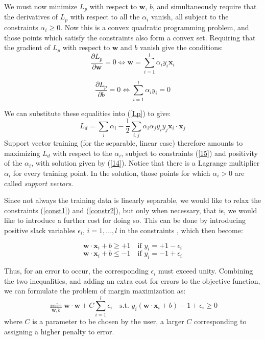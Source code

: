 We must now minimize $L_p$ with respect to $\mathbf{w}$, $b$, and simultaneously require that the
derivatives of $L_p$ with respect to all the $\alpha_i$ vanish, all subject to the constraints $\alpha_i \ge 0$. Now this is a convex quadratic programming
problem, and those points which satisfy the
constraints also form a convex set. Requiring that the gradient of $L_p$ with respect to $\mathbf{w}$ and $b$ vanish give the conditions:
\begin{equation}
\frac{\partial L_p}{\partial \mathbf{w}} = 0 \Longleftrightarrow \mathbf{w} = \sum_{i=1}^l \alpha_i y_i \mathbf{x}_i
\label{14}
\end{equation}

\begin{equation}
\frac{\partial L_p}{\partial b} = 0 \Longleftrightarrow \sum_{i=1}^l \alpha_i y_i =0
\label{15}
\end{equation}

We can substitute these equalities into (\ref{Lp}) to give:
\begin{equation}
L_d=  \sum_{i} \alpha_i - \frac{1}{2} \sum_{i,j} \alpha_i\alpha_j y_iy_j \mathbf{x}_i \cdot \mathbf{x}_j
\end{equation}
Support vector training (for the separable, linear case) therefore amounts to maximizing
$L_d$ with respect to the $\alpha_i$, subject to constraints (\ref{15}) and positivity of the $\alpha_i$, with solution
given by (\ref{14}). Notice that there is a Lagrange multiplier $\alpha_i$ for every training point. In
the solution, those points for which $\alpha_i > 0$ are called \textit{support vectors}.

Since not always the training data is linearly separable, we would like to relax the constraints (\ref{const1}) and (\ref{constr2}), but only when necessary, that is, we would like to introduce a further cost for
doing so. This can be done by introducing positive slack variables $\epsilon_i$, $i = 1, ... , l$ in the
constraints \cite{cortes1995support}, which then become:

\begin{equation}
\mathbf{w} \cdot \mathbf{x}_i + b \ge +1 \quad \text{if } y_i = +1 - \epsilon_i
\label{const1b}
\end{equation}
\begin{equation}
\mathbf{w} \cdot \mathbf{x}_i + b \le -1 \quad \text{if } y_i = -1 + \epsilon_i
\label{constr2b}
\end{equation}

Thus, for an error to occur, the corresponding $\epsilon_i$ must exceed unity. Combining the two inequalities, and adding an extra cost for errors to the objective function, we can formulate the problem of margin maximization as:
\begin{equation}
\min_{\mathbf{w},b} \mathbf{w}\cdot\mathbf{w} + C \sum_{i=1}^l \epsilon_i \quad \text{s.t.  }
y_i(\mathbf{w} \cdot \mathbf{x}_i + b)-1 + \epsilon_i \ge 0
\label{ineq-constr}
\end{equation}
where $C$ is a parameter to be chosen by the user, a larger $C$ corresponding to assigning
a higher penalty to error.

